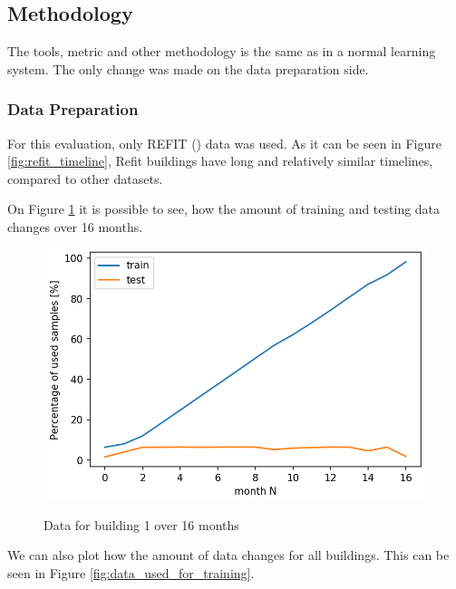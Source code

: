 \subsection{Methodology}
The tools, metric and other methodology is the same as in a normal learning system.
The only change was made on the data preparation side.

\subsubsection{Data Preparation}
For this evaluation, only REFIT (\cite{REFIT}) data was used. 
As it can be seen in Figure \ref{fig:refit_timeline},
Refit buildings have long and relatively similar timelines,
compared to other datasets.

On Figure \ref{fig:dyn_data_1} it is possible to see,
how the amount of training and testing data changes over 16 months.

\begin{figure}[H]
	\centering
	\caption{Data for building 1 over 16 months}
	\includegraphics[width=.7\textwidth]{Figures/EC/DYN/tst_tr_b1.png}
	\label{fig:dyn_data_1}
\end{figure}

We can also plot how the amount of data changes for all buildings.
This can be seen in Figure \ref{fig:data_used_for_training}.


